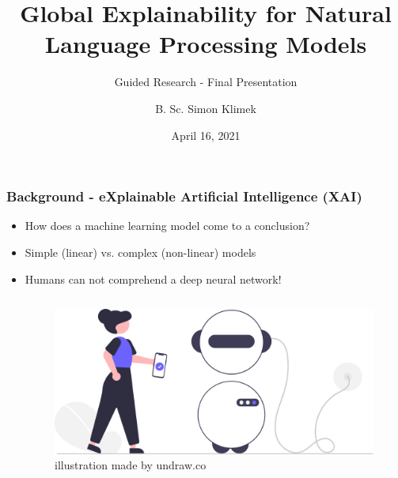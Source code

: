 \documentclass[notes]{tum-presentation}
\title[Global XAI for NLP models]{Global Explainability for Natural Language Processing Models}
\subtitle{Guided Research - Final Presentation}
\author[Simon Klimek]{B. Sc. Simon Klimek}
\institute[]{Supervisor: M. Sc. Edoardo Mosca}
\date{April 16, 2021}
\begin{document}
\begin{frame}[noframenumbering]
  \titlepage
\end{frame}
\begin{frame}
  \frametitle{Background - eXplainable Artificial Intelligence (XAI)}
  \begin{itemize}
    \item How does a machine learning model come to a conclusion?
    \item Simple (linear) vs. complex (non-linear) models
    \item Humans can not comprehend a deep neural network!
  \end{itemize}
  \begin{columns}
  \begin{column}{.6\textwidth}
  \end{column}
  \begin{column}{.4\textwidth}
    \begin{figure}[tb]
      \centering
      \includegraphics[width=\columnwidth]{pictures/ai.pdf}
      {\tiny illustration made by undraw.co}
    \end{figure}
  \end{column}
  \end{columns}
\end{frame}
\end{document}
